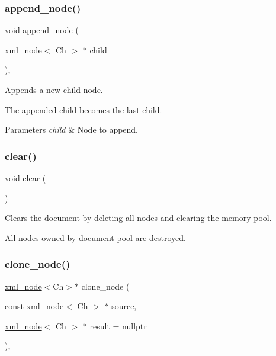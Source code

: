 \subsubsection{\texorpdfstring{append\+\_\+node()}{append\_node()}}
{\footnotesize\ttfamily void append\+\_\+node (\begin{DoxyParamCaption}\item[{\mbox{\hyperlink{classrapidxml_1_1xml__node}{xml\+\_\+node}}$<$ Ch $>$ $\ast$}]{child }\end{DoxyParamCaption})\hspace{0.3cm}{\ttfamily [inline]}, {\ttfamily [inherited]}}



Appends a new child node. 

The appended child becomes the last child. 
\begin{DoxyParams}{Parameters}
{\em child} & Node to append. \\
\hline
\end{DoxyParams}
\mbox{\label{classrapidxml_1_1xml__document_ac8bb3912a3ce86b15842e79d0b421204}} 
\subsubsection{\texorpdfstring{clear()}{clear()}}
{\footnotesize\ttfamily void clear (\begin{DoxyParamCaption}{ }\end{DoxyParamCaption})\hspace{0.3cm}{\ttfamily [inline]}}



Clears the document by deleting all nodes and clearing the memory pool. 

All nodes owned by document pool are destroyed. \mbox{\label{classrapidxml_1_1memory__pool_ae8bc45920cb126b6a4bb29f667800ea2}} 
\subsubsection{\texorpdfstring{clone\+\_\+node()}{clone\_node()}}
{\footnotesize\ttfamily \mbox{\hyperlink{classrapidxml_1_1xml__node}{xml\+\_\+node}}$<$Ch$>$$\ast$ clone\+\_\+node (\begin{DoxyParamCaption}\item[{const \mbox{\hyperlink{classrapidxml_1_1xml__node}{xml\+\_\+node}}$<$ Ch $>$ $\ast$}]{source,  }\item[{\mbox{\hyperlink{classrapidxml_1_1xml__node}{xml\+\_\+node}}$<$ Ch $>$ $\ast$}]{result = {\ttfamily nullptr} }\end{DoxyParamCaption})\hspace{0.3cm}{\ttfamily [inline]}, {\ttfamily [inherited]}}



